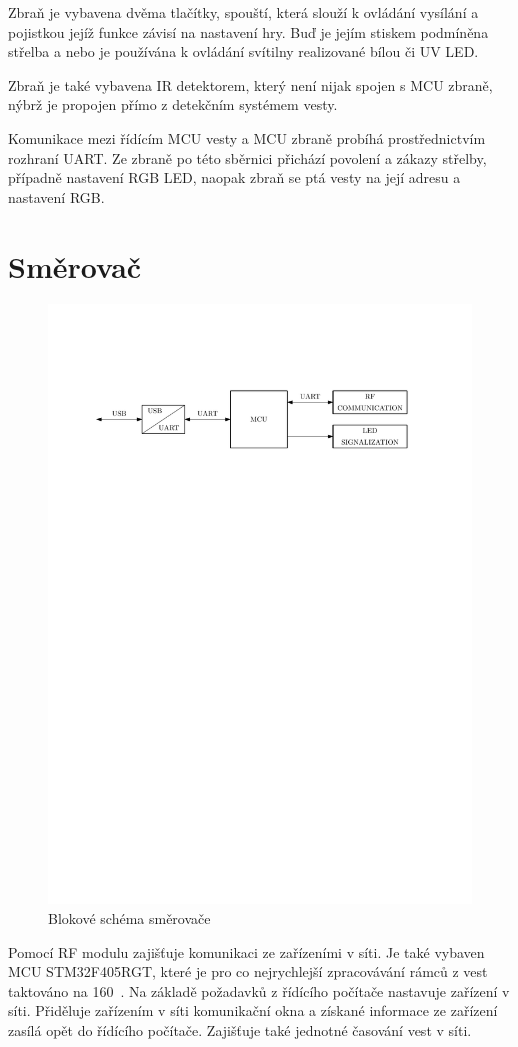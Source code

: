 Zbraň je vybavena dvěma tlačítky, spouští, která slouží k ovládání vysílání a pojistkou jejíž funkce závisí na nastavení hry. Buď je jejím stiskem podmíněna střelba a nebo je používána k ovládání svítilny realizované bílou či UV LED.

Zbraň je také vybavena IR detektorem, který není nijak spojen s MCU zbraně, nýbrž je propojen přímo z detekčním systémem vesty.

Komunikace mezi řídícím MCU vesty a MCU zbraně probíhá prostřednictvím rozhraní UART. Ze zbraně po této sběrnici přichází povolení a zákazy střelby, případně nastavení RGB LED, naopak zbraň se ptá vesty na její adresu a nastavení RGB.

\section{Směrovač}
\begin{figure}[H]
    \begin{center}
        \includegraphics[width=\textwidth]{img/router}
    \end{center}
    \caption{Blokové schéma směrovače}
\end{figure}
Pomocí RF modulu zajišťuje komunikaci ze zařízeními v síti. Je také vybaven MCU STM32F405RGT, které je pro co nejrychlejší zpracovávání rámců z vest taktováno na 160~. Na základě požadavků z řídícího počítače nastavuje zařízení v síti. Přiděluje zařízením v síti komunikační okna a získané informace ze zařízení zasílá opět do řídícího počítače. Zajišťuje také jednotné časování vest v síti.
